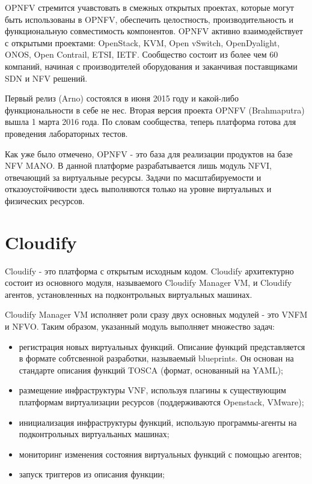 \documentclass[oneside,final,14pt,a4paper]{extreport}
\begin{document}
OPNFV стремится учавстовать в смежных открытых проектах, которые могут быть использованы в OPNFV, обеспечить целостность, производительность и функциональную совместимость компонентов. OPNFV активно взаимодействует с открытыми проектами: OpenStack, KVM, Open vSwitch, OpenDyalight, ONOS, Open Contrail, ETSI, IETF. Сообщество состоит из более чем 60 компаний, начиная с производителей оборудования и заканчивая поставщиками SDN и NFV решений.

Первый релиз (Arno) состоялся в июня 2015 году и какой-либо функциональности в себе не нес. Вторая версия проекта OPNFV (Brahmaputra) вышла 1 марта 2016 года. По словам сообщества, теперь платформа готова для проведения лабораторных тестов.\cite{opnfv-state1}

Как уже было отмечено, OPNFV - это база для реализации продуктов на базе NFV MANO. В данной платформе разрабатывается лишь модуль NFVI, отвечающий за виртуальные ресурсы. Задачи по масштабируемости и отказоустойчивости здесь выполняются только на уровне виртуальных и физических ресурсов.


\section{Cloudify}
Cloudify - это платформа с открытым исходным кодом. Cloudify архитектурно состоит из основного модуля, называемого Cloudify Manager VM, и Cloudify агентов, установленных на подконтрольных виртуальных машинах. 

Cloudify Manager VM исполняет роли сразу двух основных модулей - это VNFM и NFVO. Таким образом, указанный модуль выполняет множество задач:
\begin{itemize}
	\item регистрация новых виртуальных функций. Описание функций представляется в формате собтсвенной разработки, называемый blueprints. Он основан на стандарте описания функций TOSCA (формат, основанный на YAML);
	\item размещение инфраструктуры VNF, используя плагины к существующим платформам виртуализации ресурсов (поддерживаются Openstack, VMware);
	\item инициализация инфраструктуры функций, использую программы-агенты на подконтрольных виртуальаных машинах;
	\item мониторинг изменения состояния виртуальных функций с помощью агентов;
	\item запуск триггеров из описания функции;
\end{itemize}
\end{document}
